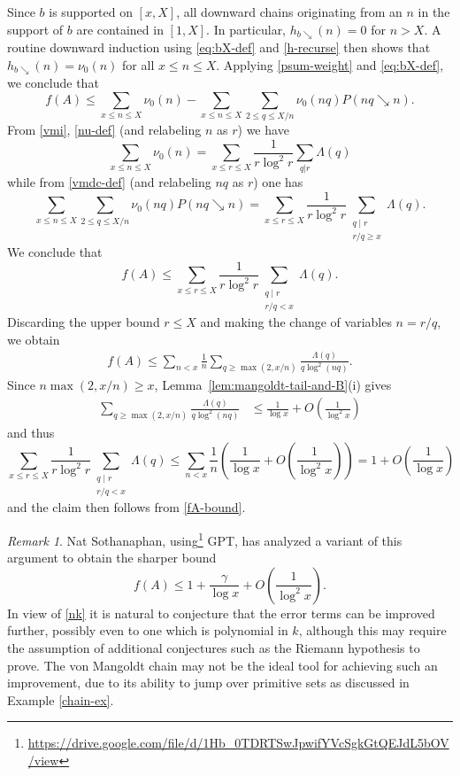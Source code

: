 \documentclass[12pt]{amsart}
\theoremstyle{definition}
\theoremstyle{remark}
\newtheorem{remark}[theorem]{Remark}
\numberwithin{equation}{section}
\newcommand{\Lam}{\Lambda}
\newcommand{\1}{{\mathbf 1}}
\begin{document}
Since $b$ is supported on $[x,X]$, all downward chains originating from an $n$ in the support of $b$ are contained in $[1,X]$.  In particular, $h_{b\searrow}(n)=0$ for $n>X$.  A routine downward induction using \eqref{eq:bX-def} and \eqref{h-recurse} then shows that $h_{b\searrow}(n) = \nu_0(n)$ for all $x \leq n \leq X$.  Applying \eqref{psum-weight} and \eqref{eq:bX-def}, we conclude that
$$ f(A) \leq \sum_{x \leq n \leq X} \nu_0(n) - \sum_{x \leq n \leq X} \sum_{2 \leq q \leq X/n} \nu_0(nq) P(nq \searrow n).$$
From \eqref{vmi}, \eqref{nu-def} (and relabeling $n$ as $r$)  we have
$$ \sum_{x \leq n \leq X} \nu_0(n) = \sum_{x \leq r \leq X} \frac{1}{r \log^2 r} \sum_{q|r} \Lambda(q)$$
while from \eqref{vmdc-def} (and relabeling $nq$ as $r$) one has
$$\sum_{x \leq n \leq X} \sum_{2 \leq q \leq X/n} \nu_0(nq) P(nq \searrow n)
= \sum_{x \leq r \leq X} \frac{1}{r \log^2 r} \sum_{\substack{q\mid r\\ r/q\ge x}}\Lam(q).$$
We conclude that
\begin{equation}\label{fA-bound}
f(A) \leq \sum_{x\le r\le X}\frac1{r\log^2 r}\sum_{\substack{q\mid r\\ r/q<x}}\Lam(q).
\end{equation}
Discarding the upper bound $r \leq X$ and making the change of variables $n=r/q$, we obtain
\begin{align*}
f(A) \leq \sum_{n<x}\frac1n \sum_{q \geq \max(2,x/n)}\frac{\Lam(q)}{q\log^2(nq)}.
\end{align*}
Since $n \max(2,x/n) \geq x$, Lemma~\ref{lem:mangoldt-tail-and-B}(i) gives
\begin{align*}
\sum_{q \geq \max(2,x/n)}\frac{\Lam(q)}{q\log^2(nq)}
&\le \frac1{\log x} + O\!\left(\frac1{\log^2 x}\right) 
\end{align*}
and thus
\begin{equation}\label{filip}
\sum_{x\le r\le X}\frac1{r\log^2 r}\sum_{\substack{q\mid r\\ r/q<x}}\Lam(q) \le \sum_{n<x}\frac1n\left(\frac1{\log x} + O\!\left(\frac1{\log^2 x}\right)\right) = 1 + O\!\left(\frac1{\log x}\right)
\end{equation}
and the claim then follows from \eqref{fA-bound}.

\begin{remark} Nat Sothanaphan, using\footnote{\url{https://drive.google.com/file/d/1Hb_0TDRTSwJpwifYVcSgkGtQEJdL5bOV/view}} GPT, has analyzed a variant of this argument to obtain the sharper bound
$$ f(A) \leq 1 + \frac{\gamma}{\log x} + O\!\left(\frac1{\log^2 x}\right).$$
In view of \eqref{nk} it is natural to conjecture that the error terms can be improved further, possibly even to one which is polynomial in $k$, although this may require the assumption of additional conjectures such as the Riemann hypothesis to prove. The von Mangoldt chain may not be the ideal tool for achieving such an improvement, due to its ability to jump over primitive sets as discussed in Example \ref{chain-ex}.
\end{remark}
\end{document}
